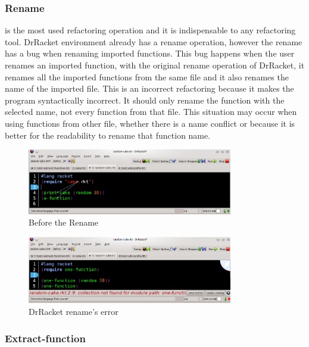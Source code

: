 \subsubsection{Rename}
\label{ssub:Rename}
is the most used refactoring operation and it is indispensable to any refactoring tool.
DrRacket environment already has a rename operation, however the rename has a bug when renaming imported functions.
This bug happens when the user renames an imported function, with the original rename operation of DrRacket, it renames all the imported functions from the same file and it also renames the name of the imported file.
This is an incorrect refactoring because it makes the program syntactically incorrect. It should only rename the function with the selected name, not every function from that file.
This situation may occur when using functions from other file, whether there is a name conflict or because it is better for the readability to rename that function name.
\begin{figure}[htbp]
	\centering
	\includegraphics[width=0.8\textwidth]{img/renameV2-1.png}
	\caption{Before the Rename}
	\label{fig:renameBefore}
\end{figure}

\begin{figure}[htbp]
	\centering
	\includegraphics[width=0.8\textwidth]{img/rename-error.png}
	\caption{DrRacket rename's error}
	\label{fig:RacketBug}
\end{figure}

\subsubsection{Extract-function}

